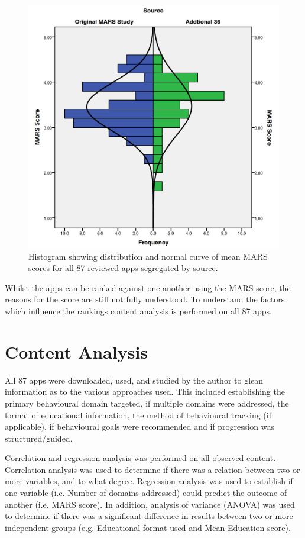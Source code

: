 \begin{figure}[h]
    \centering
    \includegraphics[scale=0.30, angle=0]{Files/prevention-study-2/figures/allapps-histogram-bysource}
    \caption{Histogram showing distribution and normal curve of mean MARS scores for all 87 reviewed apps segregated by source.}
    \label{fig: allapps-histogram}
\end{figure}

Whilst the apps can be ranked against one another using the MARS score, the reasons for the score are still not fully understood. To understand the factors which influence the rankings content analysis is performed on all 87 apps.

\section{Content Analysis} \label{subsection: content-analysis}
All 87 apps were downloaded, used, and studied by the author to glean information as to the various approaches used. This included establishing the primary behavioural domain targeted, if multiple domains were addressed, the format of educational information, the method of behavioural tracking (if applicable), if behavioural goals were recommended and if progression was structured/guided.

Correlation and regression analysis was performed on all observed content. Correlation analysis was used to determine if there was a relation between two or more variables, and to what degree. Regression analysis was used to establish if one variable (i.e. Number of domains addressed) could predict the outcome of another (i.e. MARS score). In addition, analysis of variance (ANOVA) was used to determine if there was a significant difference in results between two or more independent groups (e.g. Educational format used and Mean Education score).

